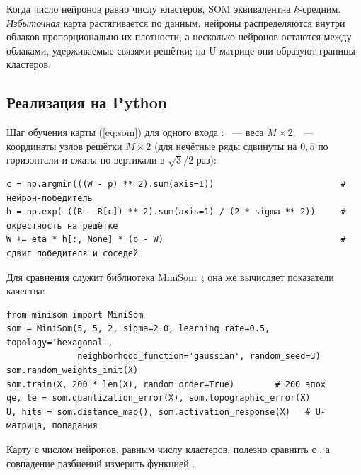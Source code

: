 Когда число нейронов равно числу кластеров, SOM эквивалентна $k$-средним. \emph{Избыточная} карта
растягивается по данным: нейроны распределяются внутри облаков пропорционально их плотности, а
несколько нейронов остаются между облаками, удерживаемые связями решётки; на U-матрице они образуют
границы кластеров.

\subsection{Реализация на Python}
\label{sec:py-som}

Шаг обучения карты (\ref{eq:som}) для одного входа : ~--- веса $M \times 2$, ~---
координаты узлов решётки $M \times 2$ (для  нечётные ряды сдвинуты на $0,5$ по горизонтали
и сжаты по вертикали в $\sqrt 3/2$ раз):
\begin{lstlisting}
c = np.argmin(((W - p) ** 2).sum(axis=1))                         # нейрон-победитель
h = np.exp(-((R - R[c]) ** 2).sum(axis=1) / (2 * sigma ** 2))     # окрестность на решётке
W += eta * h[:, None] * (p - W)                                   # сдвиг победителя и соседей
\end{lstlisting}
Для сравнения служит библиотека MiniSom~\cite{vettigli2018}; она же вычисляет показатели качества:
\begin{lstlisting}
from minisom import MiniSom
som = MiniSom(5, 5, 2, sigma=2.0, learning_rate=0.5, topology='hexagonal',
              neighborhood_function='gaussian', random_seed=3)
som.random_weights_init(X)
som.train(X, 200 * len(X), random_order=True)        # 200 эпох
qe, te = som.quantization_error(X), som.topographic_error(X)
U, hits = som.distance_map(), som.activation_response(X)   # U-матрица, попадания
\end{lstlisting}
Карту с числом нейронов, равным числу кластеров, полезно сравнить с , а
совпадение разбиений измерить функцией .
